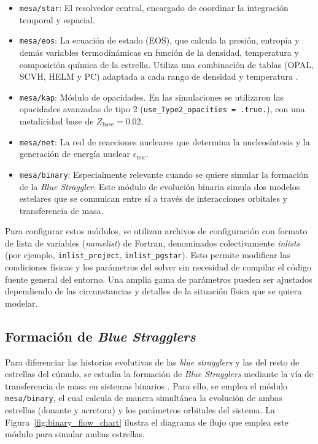 \begin{itemize}
  \item \texttt{mesa/star}: El resolvedor central, encargado de coordinar la integración temporal y espacial.
  \item \texttt{mesa/eos}: La ecuación de estado (EOS), que calcula la presión, entropía y demás variables termodinámicas en función de la densidad, temperatura y composición química de la estrella. Utiliza una combinación de tablas (OPAL, SCVH, HELM y PC) adaptada a cada rango de densidad y temperatura \citep{paxton2011}.
  \item \texttt{mesa/kap}: Módulo de opacidades. En las simulaciones se utilizaron las opacidades avanzadas de tipo 2 (\texttt{use\_Type2\_opacities = .true.}), con una metalicidad base de $Z_{\mathrm{base}} = 0.02$.
  \item \texttt{mesa/net}: La red de reacciones nucleares que determina la nucleosíntesis y la generación de energía nuclear $\epsilon_{\mathrm{nuc}}$.
  \item \texttt{mesa/binary}: Especialmente relevante cuando se quiere simular la formación de la \textit{Blue Straggler}. Este módulo de evolución binaria simula dos modelos estelares que se comunican entre sí a través de interacciones orbitales y transferencia de masa.
\end{itemize}

Para configurar estos módulos, se utilizan archivos de configuración con formato de lista de variables (\textit{namelist}) de Fortran, denominados colectivamente \textit{inlists} (por ejemplo, \texttt{inlist\_project}, \texttt{inlist\_pgstar}). Esto permite modificar las condiciones físicas y los parámetros del solver sin necesidad de compilar el código fuente general del entorno. Una amplia gama de parámetros pueden ser ajustados dependiendo de las circunstancias y detalles de la situación física que se quiera modelar.

\subsection{Formación de \textit{Blue Stragglers}}

Para diferenciar las historias evolutivas de las \textit{blue stragglers} y las del resto de estrellas del cúmulo, se estudia la formación de \textit{Blue Stragglers} mediante la vía de transferencia de masa en sistemas binarios \citep{paxton2015}. Para ello, se emplea el módulo \texttt{mesa/binary}, el cual calcula de manera simultánea la evolución de ambas estrellas (donante y acretora) y los parámetros orbitales del sistema. La Figura~\ref{fig:binary_flow_chart} ilustra el diagrama de flujo que emplea este módulo para simular ambas estrellas.

